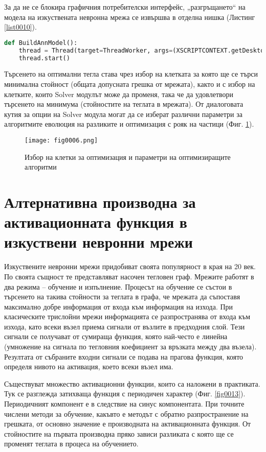 За да не се блокира графичния потребителски интерфейс, „разгръщането“ на модела на изкуствената невронна мрежа се извършва в отделна нишка (Листинг \ref{list0010}).

\begin{lstlisting}[caption=Изпълнение с отделна нишка, language=Python, basicstyle=\tiny, label=list0010]
def BuildAnnModel():
    thread = Thread(target=ThreadWorker, args=(XSCRIPTCONTEXT.getDesktop(),))
    thread.start()
\end{lstlisting}

Търсенето на оптимални тегла става чрез избор на клетката за която ще се търси минимална стойност (общата допусната грешка от мрежата), както и с избор на клетките, които Solver модулът може да променя, така че да удовлетвори търсенето на минимума (стойностите на теглата в мрежата). От диалоговата кутия за опции на Solver модула могат да се изберат различни параметри за алгоритмите еволюция на разликите и оптимизация с рояк на частици (Фиг. \ref{fig0006}).

\begin{figure}[H]
  \centering
  \texttt{[image: fig0006.png]}
  \caption{Избор на клетки за оптимизация и параметри на оптимизиращите алгоритми}
\label{fig0006}
\end{figure}

\section{Алтернативна производна за активационната функция в изкуствени невронни мрежи}

Изкуствените невронни мрежи придобиват своята популярност в края на 20 век. По своята същност те представляват насочен тегловен граф. Мрежите работят в два режима – обучение и изпълнение. Процесът на обучение се състои в търсенето на такива стойности за теглата в графа, че мрежата да съпоставя максимално добре информация от входа към информация на изхода. При класическите трислойни мрежи информацията се разпространява от входа към изхода, като всеки възел приема сигнали от възлите в предходния слой. Тези сигнали се получават от сумираща функция, която най-често е линейна (умножение на сигнала по тегловния коефициент за връзката между два възела). Резултата от събраните входни сигнали се подава на прагова функция, която определя нивото на активация, което всеки възел има.

Съществуват множество активационни функции, които са наложени в практиката. Тук се разглежда затихваща функция с периодичен характер (Фиг. \ref{fig0013}). Периодичният компонент е в следствие на синус компонентата. При точните числени методи за обучение, какъвто е методът с обратно разпространение на грешката, от основно значение е производната на активационната функция. От стойностите на първата производна пряко зависи разликата с която ще се променят теглата в процеса на обучението.

